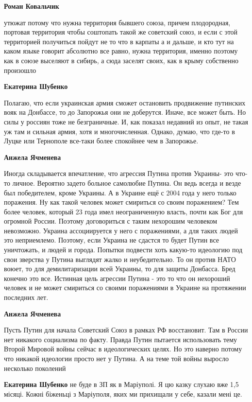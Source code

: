 \begin{itemize}
\textbf{Роман Ковальчик} 

утюжат потому что нужна территория бывшего союза, причем плодородная, портовая
территория чтобы соштопать такой же советский союз, и если с этой территорией
получиться пойдут не то что в карпаты а и дальше, и кто тут на каком языке
говорит абсолютно все равно, нужна территория, именно поэтому как в союзе
выселяют в сибирь, а сюда заселят своих, как в крыму собственно произошло

\textbf{Екатерина Шубенко} 

Полагаю, что если украинская армия сможет остановить продвижение путинских вояк
на Донбассе, то до Запорожья они не доберутся. Иначе, все может быть. Но силы у
россиян тоже не безграничные. И, как показал недавний из опыт, не такая уж там
и сильная армия, хотя и многочисленная. Однако, думаю, что где-то в Луцке или
Тернополе все-таки более спокойнее чем в Запорожье.

\textbf{Анжела Ячменева} 

Иногда складывается впечатление, что агрессия Путина против Украины- это что-то
личное. Вероятно задето больное самолюбие Путина. Он ведь всегда и везде был
победителем, кроме Украины. А в Украине ещё с 2004 года у него только
поражения. Ну как такой человек может смириться со своим поражением? Тем более
человек, который 23 года имел неограниченную власть, почти как Бог для огромной
России. Поэтому договориться с таким нехорошим человеком невозможно. Украина
ассоциируется у него с поражениями, а для таких людей это неприемлемо. Поэтому,
если Украина не сдастся то будет Путин все уничтожать, и людей и города.
Попытки подвести хоть какую-то идеологию под свои зверства у Путина выглядят
жалко и неубедительно. То он против НАТО воюет, то для демилитаризации всей
Украины, то для защиты Донбасса. Бред конечно это все. Истинная цель агрессии
Путина - это то что он нехороший человек и не может смириться со своими
поражениями в Украине на протяжении последних лет.

\textbf{Анжела Ячменева} 

Пусть Путин для начала Советский Союз в рамках РФ восстановит. Там в России нет
никакого социализма по факту. Правда Путин пытается использовать тему Второй
Мировой войны сейчас в идеологических целях. Но это наверно потому что никакой
идеологии просто нет у Путина. А на теме той войны выросло несколько поколений

\textbf{Екатерина Шубенко} не буде в ЗП як в Маріуполі. Я цю казку слухаю вже 1,5 місяці. Кожні біженьці з Маріуполя, яких ми прихищали у себе, казали мені це.


\end{itemize}
